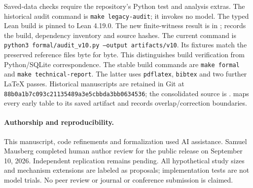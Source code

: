 \documentclass[10pt,twocolumn]{article}
\newcommand{\code}[1]{\texttt{\small #1}}
\begin{document}
Saved-data checks require the repository's Python test and analysis
extras. The historical audit command is \code{make legacy-audit}; it invokes no
model. The typed Lean build is pinned to Lean 4.19.0. The new finite-witness
result is in ;
 records the build, dependency inventory
and source hashes. The current command is
\code{python3 formal/audit\_v10.py --output artifacts/v10}. Its fixtures match
the preserved reference files byte for byte. This distinguishes build
verification from Python/SQLite correspondence.
The stable build commands are \code{make formal} and \code{make technical-report}.
The latter uses \code{pdflatex}, \code{bibtex} and two further LaTeX passes.
Historical manuscripts are retained in Git at
\code{88b0a1b7c093c21135489a3e5cbbda3bb0634536}; the consolidated source is
.  maps every
early table to its saved artifact and records overlap/correction boundaries.

\paragraph{Authorship and reproducibility.}
This manuscript, code refinements and formalization used AI assistance.
Samuel Mausberg completed human author review for the public release on
September 10, 2026. Independent replication remains pending. All hypothetical study
sizes and mechanism extensions are labeled as proposals; implementation tests
are not model trials. No peer review or journal or conference submission is claimed.

{\small


}
\end{document}
